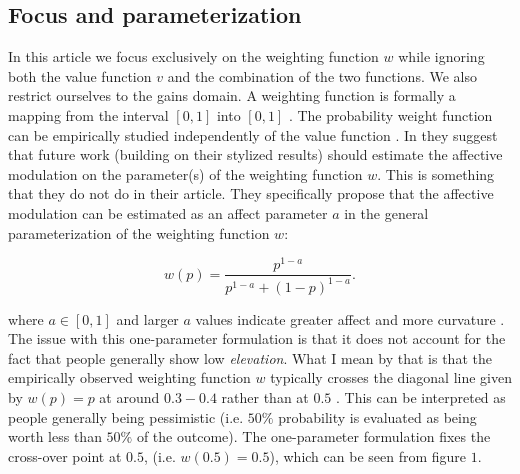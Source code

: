 \documentclass[12pt]{article}
\begin{document}
\subsection{Focus and parameterization}

In this article we focus exclusively on the
weighting function $w$ while ignoring both
the value function $v$ and the combination
of the two functions. We also restrict ourselves
to the gains domain. A weighting function
is formally a mapping from the interval
$[0, 1]$ into  $[0, 1]$ \autocite{abdellaoui2010separating}.
The probability weight function can be
empirically studied independently of
the value function \autocite{wu1996curvature}.
In \textcite{rottenstreich2001money} they
suggest that future work (building on their
stylized results) should estimate the affective
modulation on the parameter(s) of the
weighting function $w$. This is something
that they do not do in their article.
They specifically
propose that the affective modulation can
be estimated as an affect parameter $a$
in the general parameterization of the weighting
function $w$:

\[
	w(p) = \frac{p^{1-a}}
	{p^{1-a}+(1-p)^{1-a}}
.\]

where $a \in [0, 1]$ and larger $a$ values indicate
greater affect
and more curvature \autocite{rottenstreich2001money}.
The issue with this one-parameter
formulation is that it
does not account for the fact that people
generally show low \emph{elevation}.
What I mean by that is that the empirically
observed weighting function $w$ typically
crosses the diagonal line given by $w(p) = p$
at around $0.3-0.4$ rather than at $0.5$
\autocite{gonzalez1999shape,
abdellaoui2010separating,
wu1996curvature}. This can be
interpreted as people generally being
pessimistic (i.e. $50\%$ probability is
evaluated as being worth less than  $50\%$
of the outcome).
The one-parameter
formulation fixes the
cross-over point at $0.5$,
(i.e. $w(0.5) = 0.5$),
which can be seen from figure $1$.
\end{document}
